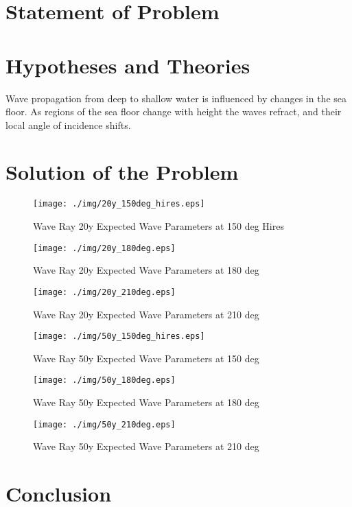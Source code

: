\section{Statement of Problem}

\section{Hypotheses and Theories}

Wave propagation from deep to shallow water is influenced by changes in the sea floor. As regions of the sea floor change with height the waves refract, and their local angle of incidence shifts. 

\section{Solution of the Problem}

\begin{figure}[H]
\centering
\texttt{[image: ./img/20y\_150deg\_hires.eps]}
\caption{Wave Ray 20y Expected Wave Parameters at 150 deg Hires}
\label{fig:prob4WHvWD}
\end{figure}

\begin{figure}[H]
\centering
\texttt{[image: ./img/20y\_180deg.eps]}
\caption{Wave Ray 20y Expected Wave Parameters at 180 deg}
\label{fig:prob4WHvWD}
\end{figure}

\begin{figure}[H]
\centering
\texttt{[image: ./img/20y\_210deg.eps]}
\caption{Wave Ray 20y Expected Wave Parameters at 210 deg}
\label{fig:prob4WHvWD}
\end{figure}


\begin{figure}[H]
\centering
\texttt{[image: ./img/50y\_150deg\_hires.eps]}
\caption{Wave Ray 50y Expected Wave Parameters at 150 deg}
\label{fig:prob4WHvWD}
\end{figure}

\begin{figure}[H]
\centering
\texttt{[image: ./img/50y\_180deg.eps]}
\caption{Wave Ray 50y Expected Wave Parameters at 180 deg}
\label{fig:prob4WHvWD}
\end{figure}

\begin{figure}[H]
\centering
\texttt{[image: ./img/50y\_210deg.eps]}
\caption{Wave Ray 50y Expected Wave Parameters at 210 deg}
\label{fig:prob4WHvWD}
\end{figure}

\section{Conclusion}